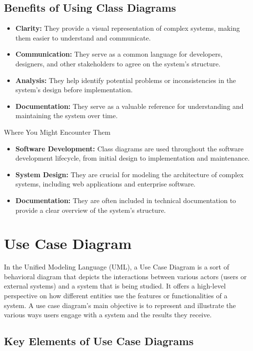 \subsection{Benefits of Using Class Diagrams}
\begin{itemize}
    \item \textbf{Clarity:} They provide a visual representation of complex systems, making them easier to understand and communicate.
    \item \textbf{Communication:} They serve as a common language for developers, designers, and other stakeholders to agree on the system’s structure.
    \item \textbf{Analysis:} They help identify potential problems or inconsistencies in the system’s design before implementation.
    \item \textbf{Documentation:} They serve as a valuable reference for understanding and maintaining the system over time.
\end{itemize}

Where You Might Encounter Them
\begin{itemize}
    \item \textbf{Software Development:} Class diagrams are used throughout the software development lifecycle, from initial design to implementation and maintenance.
    \item \textbf{System Design:} They are crucial for modeling the architecture of complex systems, including web applications and enterprise software.
    \item \textbf{Documentation:} They are often included in technical documentation to provide a clear overview of the system’s structure.
\end{itemize}
\section{Use Case Diagram}
In the Unified Modeling Language (UML), a Use Case Diagram is a sort of behavioral diagram that depicts the interactions between various actors (users or external systems) and a system that is being studied. It offers a high-level perspective on how different entities use the features or functionalities of a system. A use case diagram’s main objective is to represent and illustrate the various ways users engage with a system and the results they receive.
\subsection{Key Elements of Use Case Diagrams}

